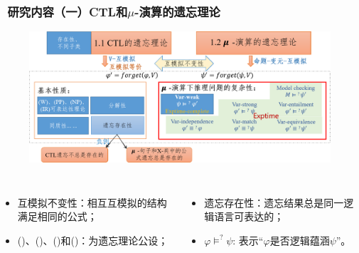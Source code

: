 \documentclass[aspectratio=1610, 9pt, CJK]{beamer}
\begin{document}
\begin{frame}  
	\frametitle{~研究内容（一）CTL和$\mu$-演算的遗忘理论}
	\begin{figure}
		\includegraphics[scale=0.45]{figures/ctlMuForgFrame3}
	\end{figure}
	{\tiny 
		\begin{columns}
			\begin{itemize} 
				\item 互模拟不变性：相互互模拟的结构满足相同的公式；
				\item (\W)、(\PP)、(\NgP)和(\IR)：为遗忘理论公设；
			\end{itemize}
			\begin{itemize}
				\item 遗忘存在性：遗忘结果总是同一逻辑语言可表达的；
				\item $\varphi \models^? \psi$: 表示“$\varphi$是否逻辑蕴涵$\psi$”。
			\end{itemize}
		\end{columns}
	} 
\end{frame}
\end{document}
